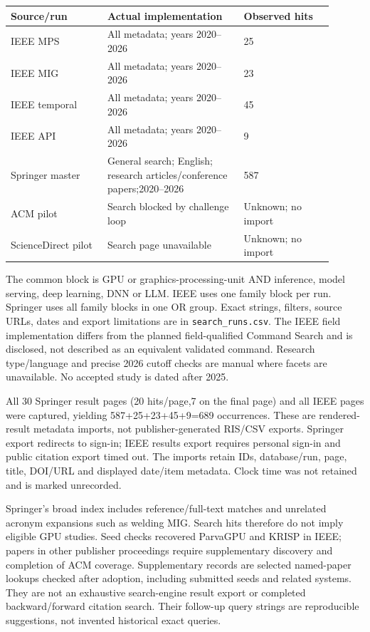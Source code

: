 \documentclass[12pt,a 4paper]{article}
\begin{document}
\begin{longtable}{P{0.27\linewidth}P{0.38\linewidth}P{0.25\linewidth}}
\toprule Source/run & Actual implementation & Observed hits\\\midrule\endhead
IEEE MPS & All metadata; years 2020--2026 &25\\
IEEE MIG & All metadata; years 2020--2026 &23\\
IEEE temporal & All metadata; years 2020--2026 &45\\
IEEE API & All metadata; years 2020--2026 &9\\
Springer master & General search; English; research articles/conference papers;2020--2026 &587\\
ACM pilot & Search blocked by challenge loop &Unknown; no import\\
ScienceDirect pilot & Search page unavailable &Unknown; no import\\
\bottomrule
\end{longtable}
The common block is GPU or graphics-processing-unit AND inference, model serving, deep learning, DNN or LLM. IEEE uses one family block per run. Springer uses all family blocks in one OR group. Exact strings, filters, source URLs, dates and export limitations are in \texttt{search\_runs.csv}. The IEEE field implementation differs from the planned field-qualified Command Search and is disclosed, not described as an equivalent validated command. Research type/language and precise 2026 cutoff checks are manual where facets are unavailable. No accepted study is dated after 2025.

All 30 Springer result pages (20 hits/page,7 on the final page) and all IEEE pages were captured, yielding 587+25+23+45+9=689 occurrences. These are rendered-result metadata imports, not publisher-generated RIS/CSV exports. Springer export redirects to sign-in; IEEE results export requires personal sign-in and public citation export timed out. The imports retain IDs, database/run, page, title, DOI/URL and displayed date/item metadata. Clock time was not retained and is marked unrecorded.

Springer's broad index includes reference/full-text matches and unrelated acronym expansions such as welding MIG. Search hits therefore do not imply eligible GPU studies. Seed checks recovered ParvaGPU and KRISP in IEEE; papers in other publisher proceedings require supplementary discovery and completion of ACM coverage. Supplementary records are selected named-paper lookups checked after adoption, including submitted seeds and related systems. They are not an exhaustive search-engine result export or completed backward/forward citation search. Their follow-up query strings are reproducible suggestions, not invented historical exact queries.
\end{document}
